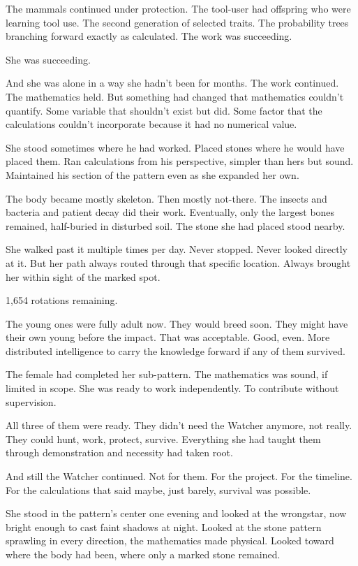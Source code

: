 The mammals continued under protection. The tool-user had offspring who were learning tool use. The second generation of selected traits. The probability trees branching forward exactly as calculated. The work was succeeding.

She was succeeding.

And she was alone in a way she hadn't been for months. The work continued. The mathematics held. But something had changed that mathematics couldn't quantify. Some variable that shouldn't exist but did. Some factor that the calculations couldn't incorporate because it had no numerical value.

She stood sometimes where he had worked. Placed stones where he would have placed them. Ran calculations from his perspective, simpler than hers but sound. Maintained his section of the pattern even as she expanded her own.

The body became mostly skeleton. Then mostly not-there. The insects and bacteria and patient decay did their work. Eventually, only the largest bones remained, half-buried in disturbed soil. The stone she had placed stood nearby.

She walked past it multiple times per day. Never stopped. Never looked directly at it. But her path always routed through that specific location. Always brought her within sight of the marked spot.

1,654 rotations remaining.

The young ones were fully adult now. They would breed soon. They might have their own young before the impact. That was acceptable. Good, even. More distributed intelligence to carry the knowledge forward if any of them survived.

The female had completed her sub-pattern. The mathematics was sound, if limited in scope. She was ready to work independently. To contribute without supervision.

All three of them were ready. They didn't need the Watcher anymore, not really. They could hunt, work, protect, survive. Everything she had taught them through demonstration and necessity had taken root.

And still the Watcher continued. Not for them. For the project. For the timeline. For the calculations that said maybe, just barely, survival was possible.

She stood in the pattern's center one evening and looked at the wrongstar, now bright enough to cast faint shadows at night. Looked at the stone pattern sprawling in every direction, the mathematics made physical. Looked toward where the body had been, where only a marked stone remained.

